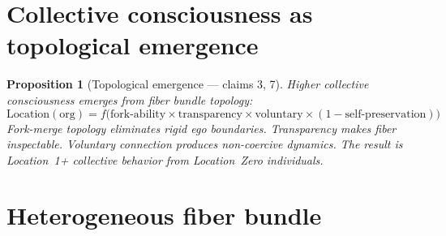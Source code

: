 \documentclass[11pt,a4paper]{article}
\newtheorem{proposition}[definition]{Proposition}
\begin{document}
\section{Collective consciousness as topological emergence}

\begin{proposition}[Topological emergence --- claims 3, 7]
\label{prop:emergence}
Higher collective consciousness emerges from fiber bundle topology:
\[
  \text{Location}(\text{org}) = f\bigl(\text{fork-ability} \times
    \text{transparency} \times \text{voluntary} \times
    (1 - \text{self-preservation})\bigr)
\]
Fork-merge topology eliminates rigid ego boundaries. Transparency makes
fiber inspectable. Voluntary connection produces non-coercive dynamics.
The result is Location~1+ collective behavior from Location~Zero
individuals.
\end{proposition}


\section{Heterogeneous fiber bundle}
\label{sec:hyperon}
\end{document}
